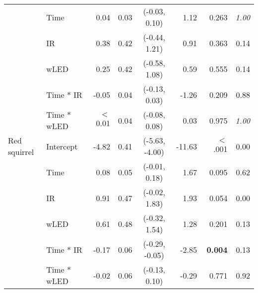 \begin{tabular}[c]{llrlcrrr}
& Time & 0.04 & 0.03 & (-0.03,  0.10) & 1.12 & 0.263  & \textit{1.00} \\ 
& IR & 0.38 & 0.42 & (-0.44,  1.21) & 0.91 & 0.363  & 0.14 \\ 
& wLED & 0.25 & 0.42 & (-0.58,  1.08) & 0.59 & 0.555  & 0.14 \\ 
& Time * IR & -0.05 & 0.04 & (-0.13,  0.03) & -1.26 & 0.209  & 0.88 \\ 
& Time * wLED & $<$ 0.01 & 0.04 & (-0.08,  0.08) & 0.03 & 0.975  & \textit{1.00} \\ 
\midrule
Red squirrel & Intercept & -4.82 & 0.41 & (-5.63, -4.00) & -11.63 & $<$ .001 & 0.00 \\ 
& Time & 0.08 & 0.05 & (-0.01,  0.18) & 1.67 & 0.095  & 0.62 \\ 
& IR & 0.91 & 0.47 & (-0.02,  1.83) & 1.93 & 0.054  & 0.00 \\ 
& wLED & 0.61 & 0.48 & (-0.32,  1.54) & 1.28 & 0.201  & 0.13 \\ 
& Time * IR & -0.17 & 0.06 & (-0.29, -0.05) & -2.85 & \textbf{0.004}  & 0.13 \\ 
& Time * wLED & -0.02 & 0.06 & (-0.13,  0.10) & -0.29 & 0.771  & 0.92 \\ 
   \bottomrule
\end{tabular}
